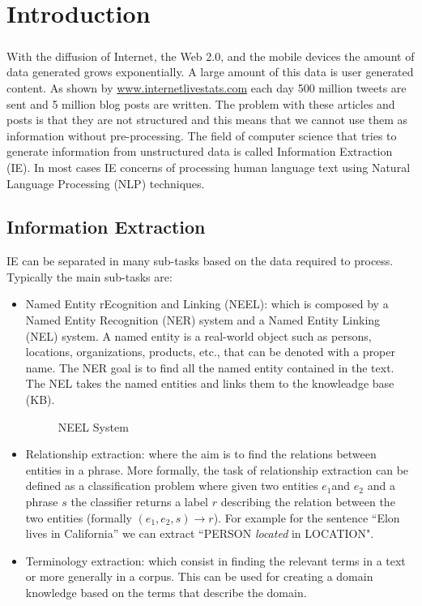 \chapter{Introduction}
\paragraph{}
With the diffusion of Internet, the Web 2.0, and the mobile devices the amount of data generated grows exponentially. A large amount of this data is user generated content. As shown by \href{http://www.internetlivestats.com/}{www.internetlivestats.com} each day 500 million tweets are sent and 5 million blog posts are written. The problem with these articles and posts is that they are not structured and this means that we cannot use them as information without pre-processing. The field of computer science that tries to generate information from unstructured data is called Information Extraction (IE). In most cases IE concerns of processing human language text using Natural Language Processing (NLP) techniques. 

\section{Information Extraction}
IE can be separated in many sub-tasks based on the data required to process. Typically the main sub-tasks are:

\begin{itemize}[itemsep = 0.1em]
\item Named Entity rEcognition and Linking (NEEL): which is composed by a Named Entity Recognition (NER) system and a Named Entity Linking (NEL) system. A named entity is a real-world object such as persons, locations, organizations, products, etc., that can be denoted with a proper name. The NER goal is to find all the named entity contained in the text. The NEL takes the named entities and links them to the knowleadge base (KB).

\begin{figure}[h!]
\caption{NEEL System}
\label{fig:neel}
\end{figure}

\item Relationship extraction: where the aim is to find the relations between entities in a phrase. More formally, the task of relationship extraction can be defined as a classification problem where given two entities \(e_1\)and \(e_2\) and a phrase \(s\) the classifier returns a label \(r\) describing the relation between the two entities (formally \((e_1, e_2, s)\rightarrow r\)). For example for the sentence ``Elon lives in California'' we can extract ``PERSON \textit{located} in LOCATION".

\item Terminology extraction: which consist in finding the relevant terms in a text or more generally in a corpus. This can be used for creating a domain knowledge based on the terms that describe the domain.
\end{itemize}

